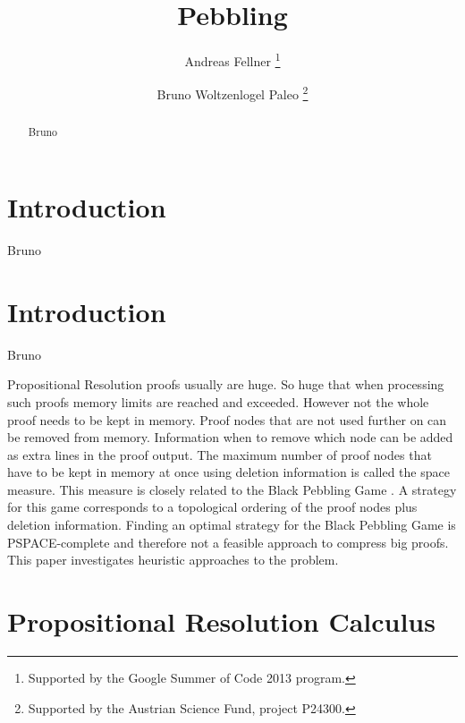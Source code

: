 \documentclass{llncs}
\title{Pebbling}
\author{
  Andreas Fellner\inst{1}
  \thanks{Supported by the Google Summer of Code 2013 program.}
  \and 
  Bruno Woltzenlogel Paleo\inst{2}
  \thanks{Supported by the Austrian Science Fund, project P24300.}
}
\institute{
  Vienna University of Technology \\
  \email{fellner.a@gmail.com}
  \and 
  Vienna University of Technology \\
  \email{bruno@logic.at}
}
\begin{document}
\maketitle

\begin{abstract}
Bruno
\end{abstract}

\setcounter{footnote}{0}

\section{Introduction}

Bruno

\section{Introduction}
Bruno

Propositional Resolution proofs usually are huge. So huge that when processing such proofs memory limits are reached and exceeded.
However not the whole proof needs to be kept in memory. 
Proof nodes that are not used further on can be removed from memory.
Information when to remove which node can be added as extra lines in the proof output.
The maximum number of proof nodes that have to be kept in memory at once using deletion information is called the space measure.
This measure is closely related to the Black Pebbling Game \cite{kasai1979classes,gilbert1980pebbling}.
A strategy for this game corresponds to a topological ordering of the proof nodes plus deletion information.
Finding an optimal strategy for the Black Pebbling Game is PSPACE-complete \cite{gilbert1980pebbling} and therefore not a feasible approach to compress big proofs.
This paper investigates heuristic approaches to the problem.

\section{Propositional Resolution Calculus}
\end{document}
